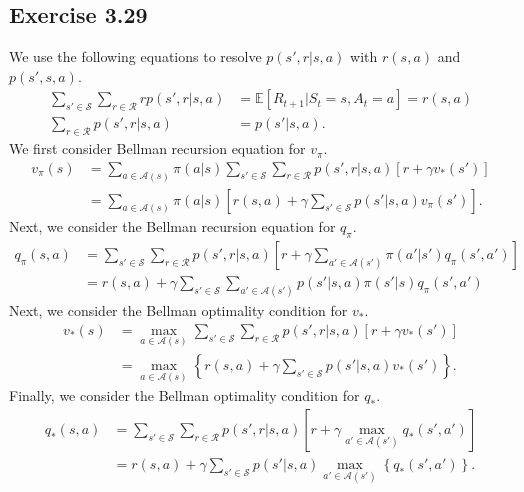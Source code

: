 \documentclass[10pt]{article}
\begin{document}
	 \subsection*{Exercise 3.29}
	 \label{ss:3.29}
	 We use the following equations to resolve $p(s',r|s,a)$ with $r(s,a)$ and $p(s',s,a)$.
	 \begin{align*}
	 \sum_{s'\in\mathcal{S}} \sum_{r\in\mathcal{R}} rp(s',r|s,a) &= \mathbb{E} \left[ R_{t+1}|S_t=s,A_t=a \right] = r(s,a)\\
	 \sum_{r\in\mathcal{R}} p(s',r|s,a) &= p(s'|s,a).
	 \end{align*}
	 We first consider Bellman recursion equation for $v_\pi$.
	 \begin{align*}
	 v_\pi(s) &= \sum_{a\in\mathcal{A}(s)} \pi(a|s) \sum_{s'\in\mathcal{S}} \sum_{r\in\mathcal{R}} p(s',r|s,a)\left[r+\gamma v_*(s') \right]\\
	 &= \sum_{a\in\mathcal{A}(s)}  \pi(a|s) \left[ r(s,a) + \gamma \sum_{s'\in\mathcal{S}} p(s'|s,a)v_\pi(s') \right].
	 \end{align*}
	 Next, we consider the Bellman recursion equation for $q_\pi$.
	 \begin{align*}
	 q_{\pi}(s,a) &= \sum_{s'\in\mathcal{S}} \sum_{r\in\mathcal{R}} p(s',r|s,a) \left[ r + \gamma \sum_{a'\in\mathcal{A}(s')} \pi(a'|s') q_\pi (s',a') \right]\\
	 &= r(s,a) + \gamma \sum_{s'\in\mathcal{S}} \sum_{a'\in\mathcal{A}(s')} p(s'|s,a) \pi(s'|s) q_\pi(s',a')
	 \end{align*}
	 Next, we consider the Bellman optimality condition for $v_*$.
	 \begin{align*}
	 v_*(s) &= \max\limits_{a\in\mathcal{A}(s)} \sum_{s'\in\mathcal{S}} \sum_{r\in\mathcal{R}} p(s',r|s,a) \left[ r + \gamma v_*(s') \right]\\
	 &= \max\limits_{a\in\mathcal{A}(s)} \left\{ r(s,a) + \gamma \sum_{s'\in\mathcal{S}} p(s'|s,a)v_*(s') \right\}.
	 \end{align*}
	 Finally, we consider the Bellman optimality condition for $q_*$.
	 \begin{align*}
	 q_*(s,a) &= \sum_{s'\in\mathcal{S}} \sum_{r\in\mathcal{R}} p(s',r|s,a) \left[ r + \gamma \max\limits_{a'\in\mathcal{A}(s')} q_*(s',a') \right]\\
	 &= r(s,a) + \gamma\sum_{s'\in\mathcal{S}} p(s'|s,a) \max\limits_{a'\in\mathcal{A}(s')}\left\{ q_*(s',a') \right\}.  
	 \end{align*}
\end{document}
